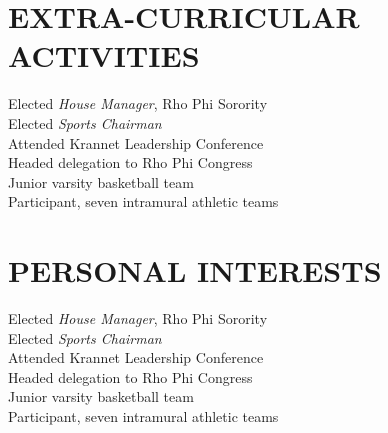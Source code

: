 \documentclass[margin, 10pt]{res} %
\begin{document}
\begin{resume}

\section{EXTRA-CURRICULAR \\ ACTIVITIES} 

Elected {\it House Manager}, Rho Phi Sorority \\
Elected {\it Sports Chairman} \\
Attended Krannet Leadership Conference \\
Headed delegation to Rho Phi Congress \\
Junior varsity basketball team \\
Participant, seven intramural athletic teams 



\section{PERSONAL INTERESTS} 

Elected {\it House Manager}, Rho Phi Sorority \\
Elected {\it Sports Chairman} \\
Attended Krannet Leadership Conference \\
Headed delegation to Rho Phi Congress \\
Junior varsity basketball team \\
Participant, seven intramural athletic teams 



\end{resume}
\end{document}
